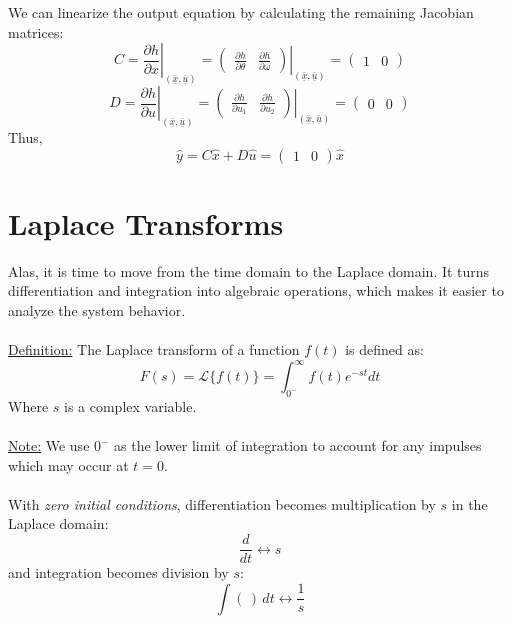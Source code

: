 ﻿\documentclass[12pt]{article}
\begin{document}
We can linearize the output equation by calculating the remaining Jacobian matrices:
\[
C = \left.\frac{\partial h}{\partial x}\right|_{(\underline{\bar{x}}, \underline{\bar{u}})}
=\left.\begin{pmatrix} \frac{\partial h}{\partial \theta} & \frac{\partial h}{\partial \omega} \end{pmatrix}\right|_{(\underline{\bar{x}}, \underline{\bar{u}})}
= \begin{pmatrix} 1 & 0 \end{pmatrix}
\]
\[
D = \left.\frac{\partial h}{\partial u}\right|_{(\underline{\bar{x}}, \underline{\bar{u}})}
=\left.\begin{pmatrix} \frac{\partial h}{\partial u_1} & \frac{\partial h}{\partial u_2} \end{pmatrix}\right|_{(\underline{\bar{x}}, \underline{\bar{u}})}
= \begin{pmatrix} 0 & 0 \end{pmatrix}
\]
Thus,
\[
\hat{y} = C\hat{x} + D\hat{u}
= \begin{pmatrix} 1 & 0 \end{pmatrix}\hat{x}
\]
\section*{Laplace Transforms}
Alas, it is time to move from the time domain to the Laplace domain. It turns differentiation and integration into algebraic operations, which makes it easier to analyze the system behavior.\\\\
\underline{Definition:} The Laplace transform of a function $f(t)$ is defined as:
\[F(s) = \mathcal{L}\{f(t)\} = \int_{0^-}^\infty f(t)e^{-st}dt\]
Where $s$ is a complex variable.\\\\
\underline{Note:} We use $0^-$ as the lower limit of integration to account for any impulses which may occur at $t=0$.\\\\
With \textit{zero initial conditions}, differentiation becomes multiplication by $s$ in the Laplace domain:
\[\frac{d}{dt} \leftrightarrow s\]
and integration becomes division by $s$:
\[\int (\,)\, dt \leftrightarrow \frac{1}{s}\]
\end{document}
